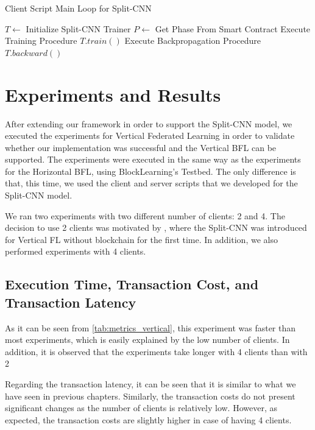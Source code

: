 \begin{algorithm}
\caption{Client Script Main Loop for Split-CNN}\label{alg:client_loop_splitcnn}
\begin{algorithmic}
\State $T \gets $ Initialize Split-CNN Trainer
    \State $P \gets$ Get Phase From Smart Contract
        \State Execute Training Procedure $T.train()$
        \State Execute Backpropagation Procedure $T.backward()$
    \EndIf
\EndWhile
\end{algorithmic}
\end{algorithm}

\section{Experiments and Results}

After extending our framework in order to support the Split-CNN model, we executed the experiments for Vertical Federated Learning in order to validate whether our implementation was successful and the Vertical BFL can be supported. The experiments were executed in the same way as the experiments for the Horizontal BFL, using BlockLearning's Testbed. The only difference is that, this time, we used the client and server scripts that we developed for the Split-CNN model.

We ran two experiments with two different number of clients: 2 and 4. The decision to use 2 clients was motivated by \cite{10.1145/3297858.3304038}, where the Split-CNN was introduced for Vertical FL without blockchain for the first time. In addition, we also performed experiments with 4 clients.

\subsection{Execution Time, Transaction Cost, and Transaction Latency}

As it can be seen from \autoref{tab:metrics_vertical}, this experiment was faster than most experiments, which is easily explained by the low number of clients. In addition, it is observed that the experiments take longer with 4 clients than with 2

Regarding the transaction latency, it can be seen that it is similar to what we have seen in previous chapters. Similarly, the transaction costs do not present significant changes as the number of clients is relatively low. However, as expected, the transaction costs are slightly higher in case of having 4 clients.

